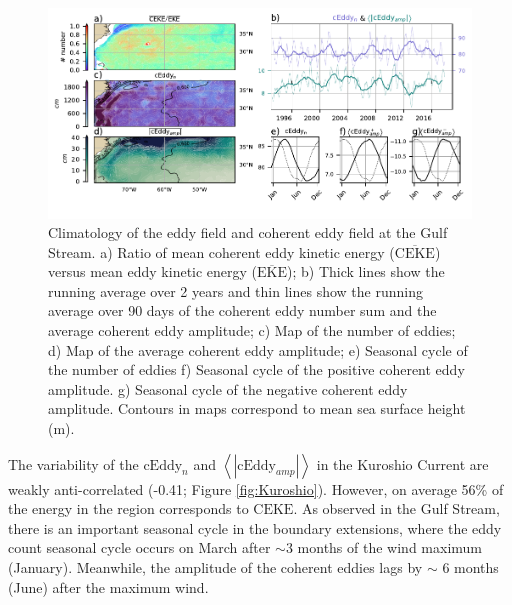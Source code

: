 \documentclass[draft,linenumbers]{agujournal2019}
\newcommand{\MEKE}{\overline{\textrm{EKE}}}
\newcommand{\MCEKE}{\overline{\textrm{CEKE}}}
\newcommand{\CEKE}{\textrm{CEKE}}
\newcommand{\cEddy}{\textrm{cEddy}}
\begin{document}
	\begin{figure}
	    \centering
	    \includegraphics[width=1\textwidth]{figures/regional_ratios_and_stats_V3_5.pdf}
	    \caption{Climatology of the eddy field and coherent eddy field at the Gulf Stream. a) Ratio of mean coherent eddy kinetic energy ($\MCEKE$) versus mean eddy kinetic energy ($\MEKE$); b) Thick lines show the running average over 2 years and thin lines show the running average over 90 days of the coherent eddy number sum and the average coherent eddy amplitude; c) Map of the number of eddies; d) Map of the average coherent eddy amplitude; e) Seasonal cycle of the number of eddies f) Seasonal cycle of the positive coherent eddy amplitude. g) Seasonal cycle of the negative coherent eddy amplitude. Contours in maps correspond to mean sea surface height (m).}
	    \label{fig:Gulf_Stream}
	\end{figure}

	The variability of the $\cEddy_{n}$ and $\left<|\cEddy_{amp}|\right>$ in the Kuroshio Current are weakly anti-correlated (-0.41; Figure \ref{fig:Kuroshio}). 
	However, on average 56\% of the energy in the region corresponds to $\CEKE$.
	As observed in the Gulf Stream, there is an important seasonal cycle in the boundary extensions, where the eddy count seasonal cycle occurs on March after $\sim$3 months of the wind maximum (January). Meanwhile, the amplitude of the coherent eddies lags by $\sim$ 6 months (June) after the maximum wind. 
\end{document}
